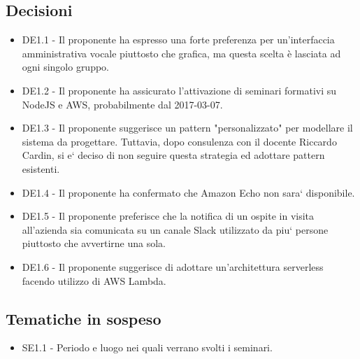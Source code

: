 \documentclass[a4paper,titlepage]{article}
\begin{document}
 \subsection{Decisioni}
 \begin{itemize}
  \item DE1.1 - Il proponente ha espresso una forte preferenza per un'interfaccia amministrativa vocale piuttosto che grafica, ma questa scelta è lasciata ad ogni singolo gruppo. 
  \item DE1.2 - Il proponente ha assicurato l'attivazione di seminari formativi su NodeJS e AWS, probabilmente dal 2017-03-07.
  \item DE1.3 - Il proponente suggerisce un pattern "personalizzato" per modellare il sistema da progettare. Tuttavia, dopo consulenza con il docente Riccardo Cardin, si e` deciso di non seguire questa strategia ed adottare pattern esistenti.
  \item DE1.4 - Il proponente ha confermato che Amazon Echo non sara` disponibile.
  \item DE1.5 - Il proponente preferisce che la notifica di un ospite in visita all'azienda sia comunicata su un canale Slack utilizzato da piu` persone piuttosto che avvertirne una sola.
  \item DE1.6 - Il proponente suggerisce di adottare un'architettura serverless facendo utilizzo di AWS Lambda.
 \end{itemize}

\subsection{Tematiche in sospeso}
  \begin{itemize}
  \item SE1.1 - Periodo e luogo nei quali verrano svolti i seminari.
  \end{itemize}
\end{document}

